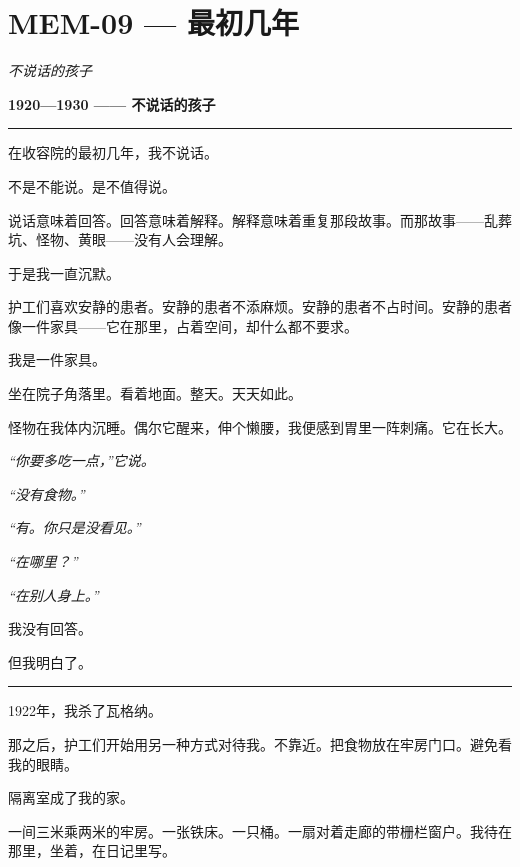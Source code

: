 \section*{\textbf{MEM-09} --- 最初几年}

\noindent \textit{不说话的孩子}

\noindent \textbf{1920—1930 —— 不说话的孩子}

\vspace{0.5em}\noindent\rule{\textwidth}{0.5pt}\vspace{0.5em}

\noindent 在收容院的最初几年，我不说话。

\noindent 不是不能说。是不值得说。

\noindent 说话意味着回答。回答意味着解释。解释意味着重复那段故事。而那故事——乱葬坑、怪物、黄眼——没有人会理解。

\noindent 于是我一直沉默。

\noindent 护工们喜欢安静的患者。安静的患者不添麻烦。安静的患者不占时间。安静的患者像一件家具——它在那里，占着空间，却什么都不要求。

\noindent 我是一件家具。

\noindent 坐在院子角落里。看着地面。整天。天天如此。

\noindent 怪物在我体内沉睡。偶尔它醒来，伸个懒腰，我便感到胃里一阵刺痛。它在长大。

\noindent \textit{“你要多吃一点，”它说。}

\noindent \textit{“没有食物。”}

\noindent \textit{“有。你只是没看见。”}

\noindent \textit{“在哪里？”}

\noindent \textit{“在别人身上。”}

\noindent 我没有回答。

\noindent 但我明白了。

\vspace{0.5em}\noindent\rule{\textwidth}{0.5pt}\vspace{0.5em}

\noindent 1922年，我杀了瓦格纳。

\noindent 那之后，护工们开始用另一种方式对待我。不靠近。把食物放在牢房门口。避免看我的眼睛。

\noindent 隔离室成了我的家。

\noindent 一间三米乘两米的牢房。一张铁床。一只桶。一扇对着走廊的带栅栏窗户。我待在那里，坐着，在日记里写。


